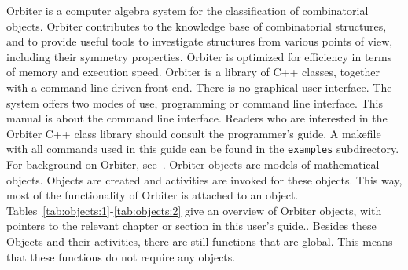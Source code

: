 Orbiter is a computer algebra system for the classification of combinatorial objects.
Orbiter contributes to the knowledge base of combinatorial structures, 
and to provide useful tools to investigate structures from various points of view, 
including their symmetry properties. 
Orbiter is optimized for efficiency in terms of memory and execution speed. 
Orbiter is a library of C++ classes, together with a command line driven front end.
There is no graphical user interface.
The system offers two modes of use, programming or command line interface.
This manual is about the command line interface.
Readers who are interested in the Orbiter C++ class library should consult the programmer's guide.
A makefile with all commands used in this guide can be found in the \verb'examples' subdirectory.
For background on Orbiter, see~\cite{Betten2020}.
Orbiter objects are 
models of mathematical objects. 
Objects are created and activities are invoked for these objects.
This way, most of the functionality of Orbiter is attached to an object. 
Tables~\ref{tab:objects:1}-\ref{tab:objects:2} give an overview of Orbiter objects, with pointers to the relevant chapter or section in this user's guide..
Besides these Objects and their activities, there are still functions that are global. This means that these functions do not require any objects.
